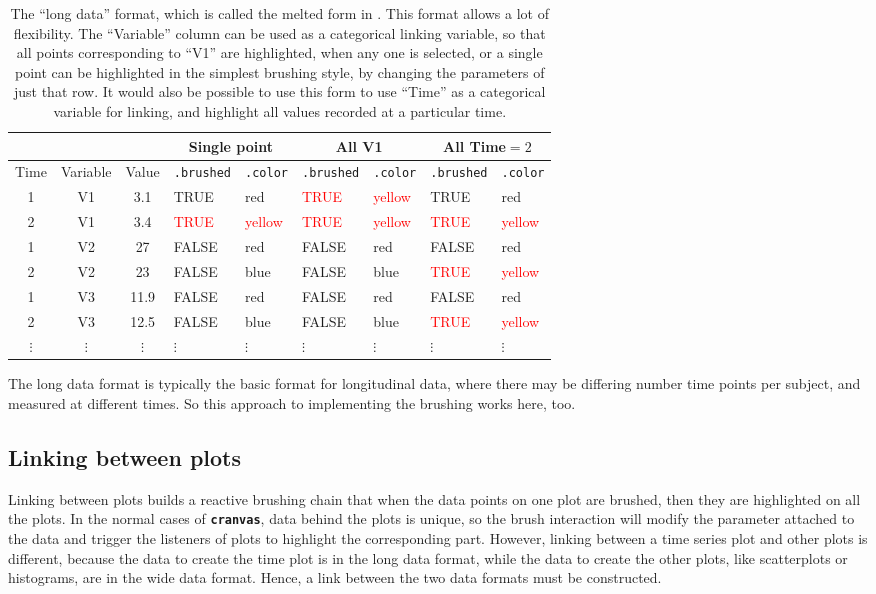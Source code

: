 \documentclass[12pt]{article}
\providecommand{\tabularnewline}{\\}
\begin{document}
\begin{table}[htp]
\begin{center}
\begin{tabular}{|c|cc|ll||ll||ll|}
\hline
\multicolumn{1}{|c}{} & \multicolumn{2}{c|}{} & \multicolumn{2}{c||}{Single point}& \multicolumn{2}{c||}{All V1}& \multicolumn{2}{c|}{All Time$=2$}\tabularnewline
\hline
Time & Variable & Value & \texttt{.brushed} & \texttt{.color} & \texttt{.brushed} & \texttt{.color} & \texttt{.brushed} & \texttt{.color}\tabularnewline
\hline
1 & V1 & 3.1 & TRUE & red & \textcolor{red}{TRUE} & \textcolor{red}{yellow} & TRUE & red \tabularnewline
2 & V1 & 3.4 & \textcolor{red}{TRUE} & \textcolor{red}{yellow} & \textcolor{red}{TRUE} & \textcolor{red}{yellow} & \textcolor{red}{TRUE} & \textcolor{red}{yellow}\tabularnewline
1 & V2 & 27 & FALSE & red & FALSE & red & FALSE & red\tabularnewline
2 & V2 & 23 & FALSE & blue & FALSE & blue & \textcolor{red}{TRUE} & \textcolor{red}{yellow} \tabularnewline
1 & V3 & 11.9 & FALSE & red & FALSE & red & FALSE & red \tabularnewline
2 & V3 & 12.5 & FALSE & blue & FALSE & blue & \textcolor{red}{TRUE} & \textcolor{red}{yellow}\tabularnewline
$\vdots$ & $\vdots$ & $\vdots$ & $\vdots$ & $\vdots$ & $\vdots$ & $\vdots$ & $\vdots$ & $\vdots$ \tabularnewline
\hline
\end{tabular}
\end{center}
\caption{\label{tab:long-data}The ``long data'' format, which is called the melted form in \citet{reshape}. This format allows a lot of flexibility. The ``Variable'' column can be used as a categorical linking variable, so that all points corresponding to ``V1'' are highlighted, when any one is selected, or a single point can be highlighted in the simplest brushing style, by changing the parameters of just that row. It would also be possible to use this form to use ``Time'' as a categorical variable for linking, and highlight all values recorded at a particular time. }
\end{table}

The long data format is typically the basic format
for longitudinal data, where there may be differing
number time points per subject, and measured at
different times. So this approach to implementing
the brushing works here, too.


\subsection{Linking between plots}

Linking between plots builds a reactive brushing chain that
when the data points on one plot are brushed, then they are
highlighted on all the plots. In the normal cases of
\texttt{\textbf{cranvas}}, data behind the plots is unique,
so the brush interaction will modify the parameter attached
to the data and trigger the listeners of plots to highlight
the corresponding part. However, linking between a time
series plot and other plots is different, because the
data to create the time plot is in the long data format,
while the data to create the other plots, like scatterplots
or histograms, are in the wide data format. Hence, a link
between the two data formats must be constructed.
\end{document}
